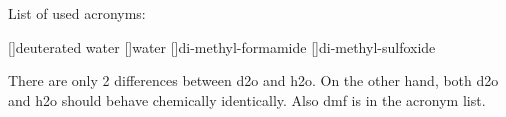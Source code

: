 List of used acronyms:
\indent
\begin{acronym}
    []{deuterated water}
    []{water}
    []{di-methyl-formamide}
    []{di-methyl-sulfoxide}
\end{acronym}

There are only 2 differences between \ac{d2o} and \ac{h2o}. On the other hand,
both \ac{d2o} and \ac{h2o} should behave chemically identically. Also
\ac{dmf} is in the acronym list.
